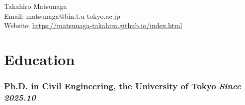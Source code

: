 \documentclass[uplatex,a4paper,10pt,dvipdfmx]{jsarticle}
\begin{document}
\begin{center}
  {\LARGE Takahiro Matsunaga}\\[2mm] %
  \small Email: {matsunaga@bin.t.u-tokyo.ac.jp} \\ Website: \url{https://matsunaga-takahiro.github.io/index.html}
\end{center}

\section*{Education}
\subsubsection*{Ph.D. in Civil Engineering, the University of Tokyo \hfill \textit{Since 2025.10}}
\end{document}
